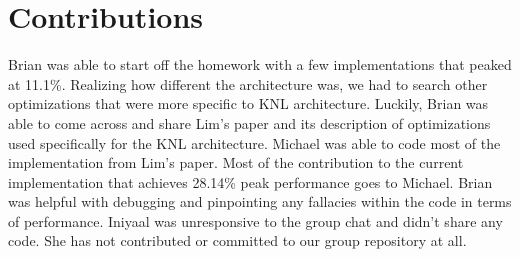 \documentclass{article}
\begin{document}
\section{Contributions}
Brian was able to start off the homework with a few implementations that peaked at 11.1\%. Realizing how different the architecture was, we had to search other optimizations that were more specific to KNL architecture. Luckily, Brian was able to come across and share Lim's paper and its description of optimizations used specifically for the KNL architecture. Michael was able to code most of the implementation from Lim's paper. Most of the contribution to the current implementation that achieves 28.14\% peak performance goes to Michael. Brian was helpful with debugging and pinpointing any fallacies within the code in terms of performance. Iniyaal was unresponsive to the group chat and didn't share any code. She has not contributed or committed to our group repository at all.


 
\end{document}
